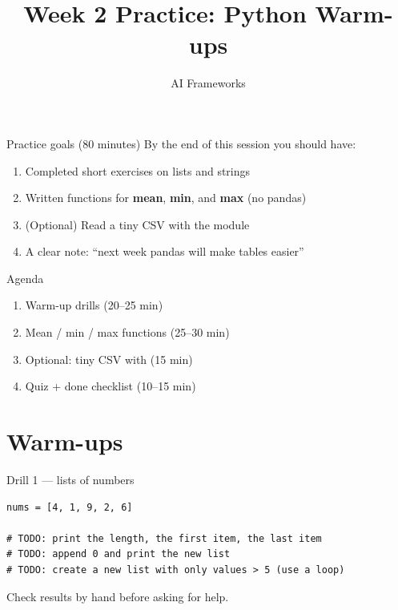 \documentclass[aspectratio=169,11pt]{beamer}
\title{Week 2 Practice: Python Warm-ups}
\subtitle{AI Frameworks}
\begin{document}
    \begin{frame}
        \titlepage
    \end{frame}

    \begin{frame}{Practice goals (80 minutes)}
        By the end of this session you should have:
        \begin{enumerate}
            \item Completed short exercises on lists and strings
            \item Written functions for \textbf{mean}, \textbf{min}, and \textbf{max} (no pandas)
            \item (Optional) Read a tiny CSV with the  module
            \item A clear note: ``next week pandas will make tables easier''
        \end{enumerate}
    \end{frame}

    \begin{frame}{Agenda}
        \begin{enumerate}
            \item Warm-up drills (20--25 min)
            \item Mean / min / max functions (25--30 min)
            \item Optional: tiny CSV with  (15 min)
            \item Quiz + done checklist (10--15 min)
        \end{enumerate}
    \end{frame}

    \section{Warm-ups}

    \begin{frame}[fragile]{Drill 1 --- lists of numbers}
        \begin{lstlisting}
nums = [4, 1, 9, 2, 6]

# TODO: print the length, the first item, the last item
# TODO: append 0 and print the new list
# TODO: create a new list with only values > 5 (use a loop)
        \end{lstlisting}
        \vspace{0.3em}
        Check results by hand before asking for help.
    \end{frame}
\end{document}
